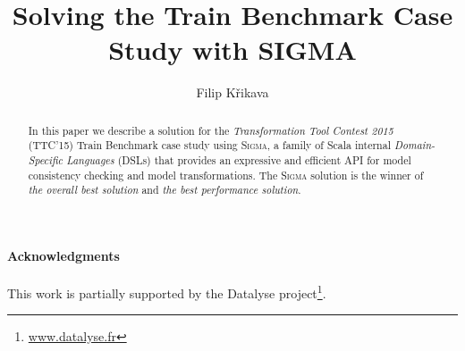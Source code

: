 \documentclass[submission]{eptcs}
\title{Solving the \TTC Train Benchmark Case Study with SIGMA}
\author{
  Filip Křikava
  \institute{University Lille 1 - LIFL, France}
  \institute{INRIA Lille, Nord Europe}
  \email{\href{mailto:filip.krikava@inria.fr}{filip.krikava@inria.fr}}
}
\newcommand{\SIGMA}{\textsc{Sigma}\xspace}
\newcommand{\TTC}{TTC'15\xspace}
\begin{document}
\maketitle

\begin{abstract}
In this paper we describe a solution for the \emph{Transformation Tool Contest 2015} (\TTC) Train Benchmark case study using \SIGMA, a family of Scala internal \emph{Domain-Specific Languages} (DSLs) that provides an expressive and efficient API for model consistency checking and model transformations.
The \SIGMA solution is the winner of \emph{the overall best solution} and \emph{the best performance solution}.
\end{abstract}






\paragraph{Acknowledgments}
This work is partially supported by the Datalyse project\footnote{\url{www.datalyse.fr}}.


	

\clearpage
\appendix


\end{document}
